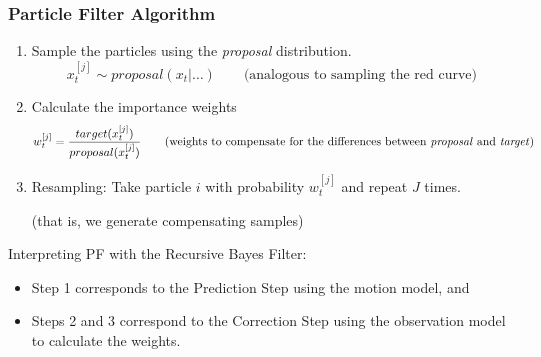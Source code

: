 \begin{frame}
    \frametitle{Particle Filter Algorithm}
    
    \begin{enumerate}
        \item Sample the particles using the \emph{proposal} distribution.
            \begin{equation*}
                x_{t}^{[j]} \sim proposal(x_{t} | \ldots) \qquad \text{(analogous to sampling the red curve)}
            \end{equation*}
        \item Calculate the importance weights
            \begin{equation*}
                w_t^{[j]} = \frac{target(x_t^{[j]})}{proposal(x_t^{[j]})} \qquad \text{{(weights to compensate for the differences between \emph{proposal} and \emph{target})}}
            \end{equation*}
        \item Resampling: Take particle $i$ with probability $w_{t}^{[j]}$ and repeat $J$ times.
            
            
            (that is, we generate compensating samples)
    \end{enumerate}
    
    \vspace{1cm}
    
    Interpreting PF with the Recursive Bayes Filter:
    \begin{itemize}
        \item Step 1 corresponds to the Prediction Step using the motion model, and
        \item Steps 2 and 3 correspond to the Correction Step using the observation model to calculate the weights.
    \end{itemize}
    
\end{frame}

